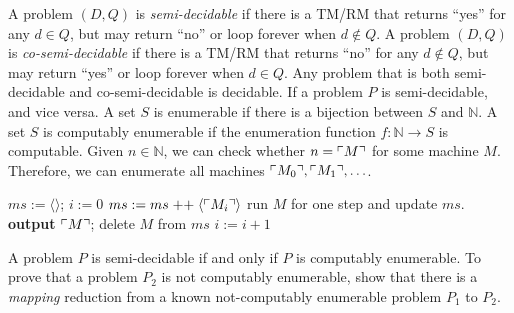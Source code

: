  A problem $(D,Q)$ is \emph{semi-decidable} if there is a TM/RM that returns ``yes'' for any $d \in Q$, but may return ``no'' or loop forever when $d \notin Q$.
 A problem $(D, Q)$ is \emph{co-semi-decidable} if there is a TM/RM that returns ``no'' for any $d \notin Q$, but may return ``yes'' or loop forever when $d \in Q$.
 Any problem that is both semi-decidable and co-semi-decidable is decidable.
 If a problem $P$ is semi-decidable, and vice versa.
 A set $S$ is enumerable if there is a bijection between $S$ and $\mathbb{N}$.
 A set $S$ is computably enumerable if the enumeration function $f: \mathbb{N} \to S$ is computable.
 Given $n \in \mathbb{N}$, we can check whether $n = \ulcorner M \urcorner$ for some machine $M$. Therefore, we can enumerate all machines $\ulcorner M_0 \urcorner,\ulcorner M_1 \urcorner,\ldots$.
\begin{algorithmic}
    \State $ms := \langle\rangle$; $i := 0$
        \State $ms := ms \mathrel{++} \langle\ulcorner M_i \urcorner\rangle$
            \State run $M$ for one step and update $ms$.
                \State \textbf{output} $\ulcorner M \urcorner$; delete $M$ from $ms$
            \EndIf
        \EndFor
        \State $i := i+1$
    \EndWhile
\end{algorithmic}
 A problem $P$ is semi-decidable if and only if $P$ is computably enumerable.
 To prove that a problem $P_2$ is not computably enumerable, show that there is a \emph{mapping} reduction from a known not-computably enumerable problem $P_1$ to $P_2$.
